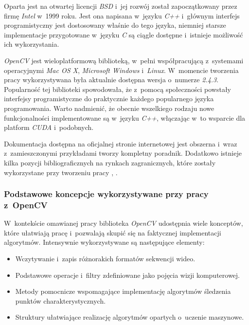         Oparta jest na otwartej licencji \textit{BSD} i~jej rozwój został zapoczątkowany przez firmę \textit{Intel} w~1999 roku. Jest ona napisana w~języku \textit{C++} i~głównym interfejs programistyczny jest dostosowany właśnie do tego języka, niemniej starsze implementacje przygotowane w~języku \textit{C} są ciągle dostępne i~istnieje możliwość ich wykorzystania.

        \textit{OpenCV} jest wieloplatformową biblioteką, w~pełni współpracującą z~systemami operacyjnymi \textit{Mac OS X}, \textit{Microsoft Windows} i~\textit{Linux}. W~momencie tworzenia pracy wykorzystywana była aktualnie dostępna wersja o~numerze \textit{2.4.3}. Popularność tej biblioteki spowodowała, że z~pomocą społeczności powstały interfejsy programistyczne do praktycznie każdego popularnego języka programowania. Warto nadmienić, że obecnie wszelkiego rodzaju nowe funkcjonalności implementowane są w~języku \textit{C++}, włączając w~to wsparcie dla platform \textit{CUDA} i~podobnych.

        Dokumentacja dostępna na oficjalnej stronie internetowej jest obszerna i~wraz z~zamieszczonymi przykładami tworzy kompletny poradnik. Dodatkowo istnieje kilka pozycji bibliograficznych na rynkach zagranicznych, które zostały wykorzystane przy tworzeniu pracy \cite{LearningOpenCV}, \cite{OpenCVCookbook}.

      \subsubsection{Podstawowe koncepcje wykorzystywane przy pracy z~OpenCV}

        W~kontekście omawianej pracy biblioteka \textit{OpenCV} udostępnia wiele konceptów, które ułatwiają pracę i~pozwalają skupić się na faktycznej implementacji algorytmów. Intensywnie wykorzystywane są następujące elementy:
          \begin{itemize}
            \item Wczytywanie i~zapis różnorakich formatów sekwencji wideo.
            \item Podstawowe operacje i~filtry zdefiniowane jako pojęcia wizji komputerowej.
            \item Metody pomocnicze wspomagające implementację algorytmów śledzenia punktów charakterystycznych.
            \item Struktury ułatwiające realizację algorytmów opartych o~uczenie maszynowe.
          \end{itemize}

